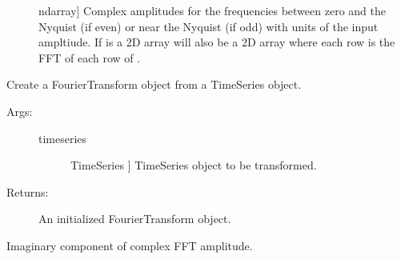 \documentclass[letterpaper,10pt,english]{sphinxmanual}
\begin{document}
\begin{fulllineitems}
\begin{fulllineitems}
\begin{description}
\begin{description}
\begin{description}
\item[{}] \leavevmode{[}ndarray{]}
Complex amplitudes for the frequencies between zero
and the Nyquist (if even) or near the Nyquist 
(if odd) with units of the input ampltiude.
If  is a 2D array  will also be a 2D
array where each row is the FFT of each row of 
.

\end{description}

\end{description}

\end{description}

\end{fulllineitems}


\begin{fulllineitems}
\label{\detokenize{index:sigpropy.FourierTransform.from_timeseries}}
Create a FourierTransform object from a TimeSeries object.
\begin{description}
\item[{Args:}] \leavevmode\begin{description}
\item[{timeseries}] \leavevmode{[}TimeSeries {]}
TimeSeries object to be transformed.

\end{description}

\item[{Returns:}] \leavevmode
An initialized FourierTransform object.

\end{description}

\end{fulllineitems}


\begin{fulllineitems}
\label{\detokenize{index:sigpropy.FourierTransform.imag}}
Imaginary component of complex FFT amplitude.

\end{fulllineitems}


\end{fulllineitems}
\end{document}
